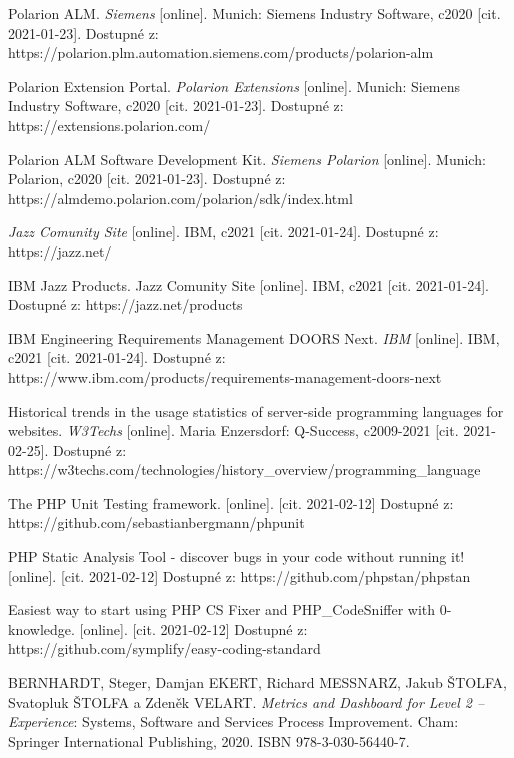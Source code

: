 \documentclass[czech,master]{diploma}
\begin{document}
\begin{thebibliography}{43}
Polarion ALM. \textit{Siemens} [online]. Munich: Siemens Industry Software, c2020 [cit. 2021-01-23]. Dostupné z: https://polarion.plm.automation.siemens.com/products/polarion-alm

Polarion Extension Portal. \textit{Polarion Extensions} [online]. Munich: Siemens Industry Software, c2020 [cit. 2021-01-23]. Dostupné z: https://extensions.polarion.com/

Polarion ALM Software Development Kit. \textit{Siemens Polarion} [online]. Munich: Polarion, c2020 [cit. 2021-01-23]. Dostupné z: https://almdemo.polarion.com/polarion/sdk/index.html

\textit{Jazz Comunity Site} [online]. IBM, c2021 [cit. 2021-01-24]. Dostupné z: https://jazz.net/

IBM Jazz Products. Jazz Comunity Site [online]. IBM, c2021 [cit. 2021-01-24]. Dostupné z: https://jazz.net/products

IBM Engineering Requirements Management DOORS Next. \textit{IBM} [online]. IBM, c2021 [cit. 2021-01-24]. Dostupné z: https://www.ibm.com/products/requirements-management-doors-next

Historical trends in the usage statistics of server-side programming languages for websites. \textit{W3Techs} [online]. Maria Enzersdorf: Q-Success, c2009-2021 [cit. 2021-02-25]. Dostupné z: https://w3techs.com/technologies/history\_overview/programming\_language

 The PHP Unit Testing framework. [online]. [cit. 2021-02-12] Dostupné z: https://github.com/sebastianbergmann/phpunit

 PHP Static Analysis Tool - discover bugs in your code without running it! [online]. [cit. 2021-02-12] Dostupné z: https://github.com/phpstan/phpstan

 Easiest way to start using PHP CS Fixer and PHP\_CodeSniffer with 0-knowledge. [online]. [cit. 2021-02-12] Dostupné z: https://github.com/symplify/easy-coding-standard

BERNHARDT, Steger, Damjan EKERT, Richard MESSNARZ, Jakub ŠTOLFA, Svatopluk ŠTOLFA a Zdeněk VELART. \textit{Metrics and Dashboard for Level 2 – Experience}: Systems, Software and Services Process Improvement. Cham: Springer International Publishing, 2020. ISBN 978-3-030-56440-7.


\end{thebibliography}
\end{document}
